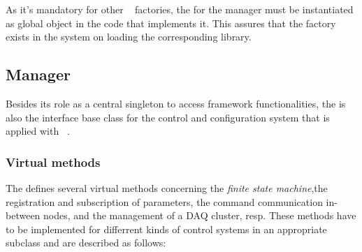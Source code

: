 As it's mandatory for other \dabc~ factories, 
the  for the manager must be
instantiated as global object in the code that implements it.
This assures that the factory exists in the system on
loading the corresponding library.

\subsection{Manager}
\label{prog_manager_controls_manager}
Besides its role as a central singleton to access framework functionalities,
the  is also the interface base class for the 
control and configuration system that is applied with \dabc~. 

\subsubsection{Virtual methods}
The  defines several virtual methods concerning the {\em finite state machine},the registration and subscription of parameters, the command communication
in-between nodes, and the management of a DAQ cluster, resp.
These methods have to be implemented for differrent kinds of control systems in
an appropriate subclass and are described as follows:

